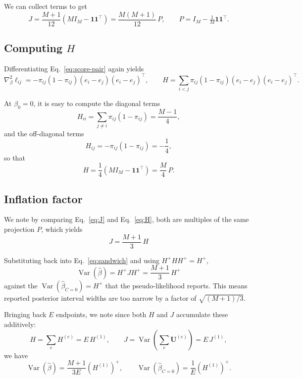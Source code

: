 \documentclass{article}
\DeclareMathOperator{\Var}{Var}
\begin{document}
We can collect terms to get
\begin{equation}
  J = \frac{M+1}{12}\left(M I_M - \mathbf{1}\mathbf{1}^\top\right) = \frac{M(M+1)}{12}\, P,
  \qquad P = I_M - \tfrac{1}{M}\mathbf{1}\mathbf{1}^\top .
  \label{eq:J}
\end{equation}

\subsection{Computing \texorpdfstring{$H$}{H}}
Differentiating Eq.~\ref{eq:score-pair} again yields
\begin{equation}
  \nabla^2_\beta \ell_{ij} = -\pi_{ij}(1 - \pi_{ij})(e_i - e_j)(e_i - e_j)^\top,
  \qquad
  H = \sum_{i<j} \pi_{ij}(1 - \pi_{ij}) (e_i - e_j)(e_i - e_j)^\top.
\end{equation}

At $\beta_0 = 0$, it is easy to compute the diagonal terms
\begin{equation}
  H_{ii} = \sum_{j \neq i} \pi_{ij}(1 - \pi_{ij}) = \frac{M-1}{4},
\end{equation} 
and the off-diagonal terms
\begin{equation}
  H_{ij} = -\pi_{ij}(1 - \pi_{ij}) = -\frac{1}{4},
\end{equation}
so that
\begin{equation}
  H = \frac{1}{4}\left(M I_M - \mathbf{1}\mathbf{1}^\top\right) = \frac{M}{4}\, P .
  \label{eq:H}
\end{equation}

\subsection{Inflation factor}
We note by comparing Eq.~\ref{eq:J} and Eq.~\ref{eq:H}, both are multiples of the same projection $P$, which yields
\begin{equation}
  \boxed{\;J = \frac{M+1}{3}\,H\;}
\end{equation}

Substituting back into Eq.~\ref{eq:sandwich} and using $H^+HH^+ = H^+$,
\begin{equation}
  \boxed{\;\Var(\hat\beta) = H^{+}JH^{+} = \frac{M+1}{3}\,H^{+}\;}
\end{equation}
against the $\Var(\hat\beta_{C=0}) = H^{+}$ that the pseudo-likelihood reports. This means reported posterior interval widths are too narrow by a factor of $\sqrt{(M+1)/3}$.

Bringing back $E$ endpoints, we note since both $H$ and $J$ accumulate these additively:
\begin{equation}
  H = \sum_e H^{(e)} = E\,H^{(1)},
  \qquad
  J = \Var\!\left(\sum_e \mathbf{U}^{(e)}\right) = E\,J^{(1)},
\end{equation}
we have
\begin{equation}
  \Var(\hat\beta) = \frac{M+1}{3E}\left(H^{(1)}\right)^{+},
  \qquad
  \Var(\hat\beta_{C=0}) = \frac{1}{E}\left(H^{(1)}\right)^{+}.
\end{equation}
\end{document}
